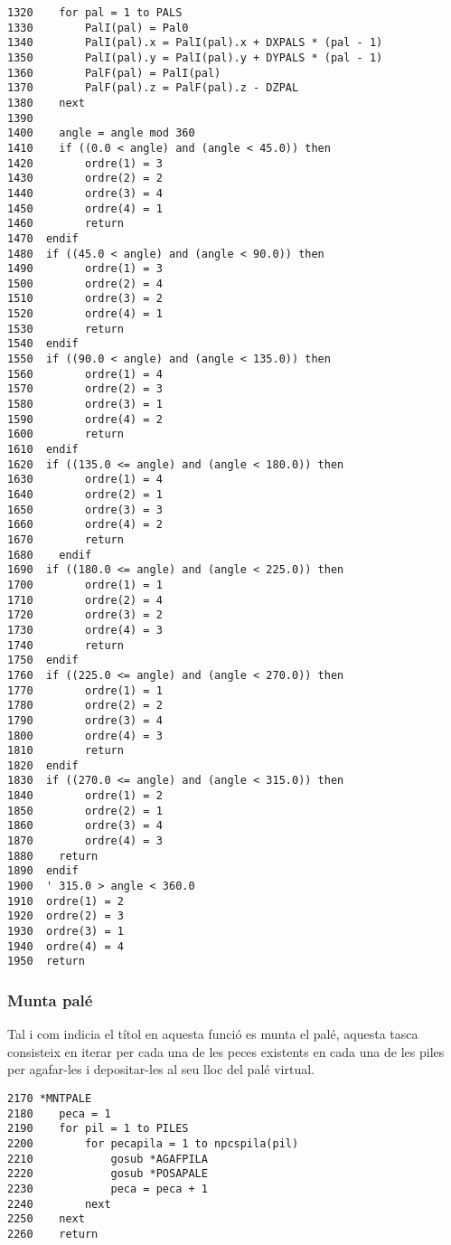 \begin{verbatim}
1320    for pal = 1 to PALS
1330        PalI(pal) = Pal0
1340        PalI(pal).x = PalI(pal).x + DXPALS * (pal - 1)
1350        PalI(pal).y = PalI(pal).y + DYPALS * (pal - 1)
1360        PalF(pal) = PalI(pal)
1370        PalF(pal).z = PalF(pal).z - DZPAL
1380    next
1390 	
1400    angle = angle mod 360
1410 	if ((0.0 < angle) and (angle < 45.0)) then
1420        ordre(1) = 3
1430        ordre(2) = 2
1440        ordre(3) = 4
1450        ordre(4) = 1
1460        return
1470  endif
1480  if ((45.0 < angle) and (angle < 90.0)) then 
1490        ordre(1) = 3
1500        ordre(2) = 4
1510        ordre(3) = 2
1520        ordre(4) = 1
1530        return
1540  endif
1550  if ((90.0 < angle) and (angle < 135.0)) then
1560        ordre(1) = 4
1570        ordre(2) = 3
1580        ordre(3) = 1
1590        ordre(4) = 2
1600        return
1610  endif
1620  if ((135.0 <= angle) and (angle < 180.0)) then
1630        ordre(1) = 4
1640        ordre(2) = 1
1650        ordre(3) = 3
1660        ordre(4) = 2
1670 		return
1680 	endif
1690  if ((180.0 <= angle) and (angle < 225.0)) then 
1700        ordre(1) = 1
1710        ordre(2) = 4
1720        ordre(3) = 2
1730        ordre(4) = 3
1740        return
1750  endif
1760  if ((225.0 <= angle) and (angle < 270.0)) then
1770        ordre(1) = 1
1780        ordre(2) = 2
1790        ordre(3) = 4
1800        ordre(4) = 3
1810        return
1820  endif
1830  if ((270.0 <= angle) and (angle < 315.0)) then 
1840        ordre(1) = 2
1850        ordre(2) = 1
1860        ordre(3) = 4
1870        ordre(4) = 3
1880 	return
1890  endif
1900  ' 315.0 > angle < 360.0
1910  ordre(1) = 2
1920  ordre(2) = 3
1930  ordre(3) = 1
1940  ordre(4) = 4
1950  return
\end{verbatim}

\subsubsection{Munta palé}
Tal i com indicia el títol en aquesta funció es munta el palé, aquesta tasca
consisteix en iterar per cada una de les peces existents en cada una de les
piles per agafar-les i depositar-les al seu lloc del palé virtual.

\begin{verbatim}
2170 *MNTPALE
2180    peca = 1
2190    for pil = 1 to PILES 
2200        for pecapila = 1 to npcspila(pil)
2210            gosub *AGAFPILA
2220            gosub *POSAPALE
2230            peca = peca + 1
2240        next
2250    next
2260    return
\end{verbatim}

